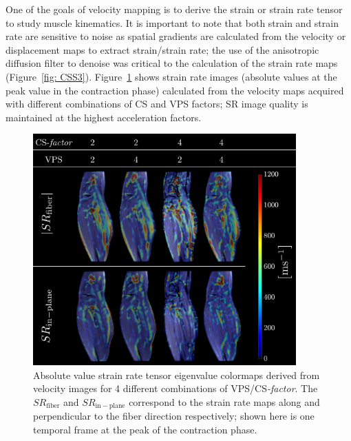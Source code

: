One of the goals of velocity mapping is to derive the strain or strain rate tensor to study muscle kinematics. 
It is important to note that both strain and strain rate are sensitive to noise as spatial gradients are calculated from the velocity or displacement maps to extract strain/strain rate; the use of the anisotropic diffusion filter to denoise was critical to the calculation of the strain rate maps (Figure~\ref{fig: CSS3}). 
Figure~\ref{fig: CS9} shows strain rate images (absolute values at the peak value in the contraction phase) calculated from the velocity maps acquired with different combinations of CS and VPS factors; SR image quality is maintained at the highest acceleration factors. 
\begin{figure}[!htb]
\vspace{+0.2cm}
\centering
\includegraphics[width=0.9\textwidth]{Figures/CS1_14.pdf}
\caption[Absolute value strain rate tensor eigenvalue colormaps derived from velocity images for 4 different combinations of VPS/\mbox{CS\textit{-factor}}]{Absolute value strain rate tensor eigenvalue colormaps derived from velocity images for 4 different combinations of VPS/\mbox{CS\textit{-factor}}. The $SR_\mathrm{fiber}$ and $SR_\mathrm{in-plane}$ correspond to the strain rate maps along and perpendicular to the fiber direction respectively; shown here is one temporal frame at the peak of the contraction phase.}
\label{fig: CS9}
\end{figure}
